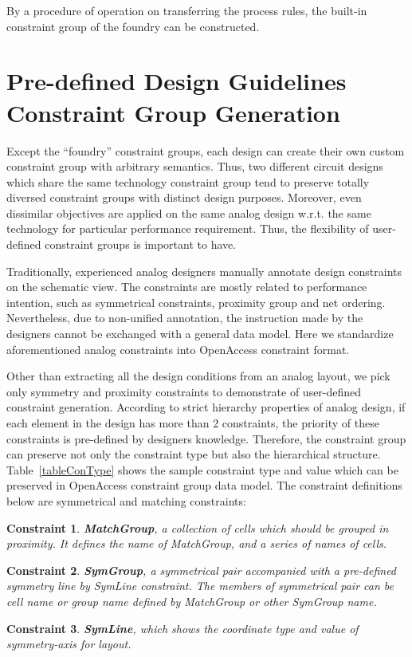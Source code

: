   By a procedure of operation on transferring the process rules, the built-in constraint group of the foundry can be constructed.

  \section{Pre-defined Design Guidelines Constraint Group Generation}\label{sec:PreDesignCG}
    Except the ``foundry'' constraint groups, each design can create their own custom constraint group with arbitrary semantics. Thus, two different circuit designs which share the same technology constraint group tend to preserve totally diversed constraint groups with distinct design purposes. Moreover, even dissimilar objectives are applied on the same analog design w.r.t. the same technology for particular performance requirement. Thus, the flexibility of user-defined constraint groups is important to have. 

    Traditionally, experienced analog designers manually annotate design constraints on the schematic view. The constraints are mostly related to performance intention, such as symmetrical constraints, proximity group and net ordering. Nevertheless, due to non-unified annotation, the instruction made by the designers cannot be exchanged with a general data model. Here we standardize aforementioned analog constraints into OpenAccess constraint format. 
  
    Other than extracting all the design conditions from an analog layout, we pick only symmetry and proximity constraints to demonstrate of user-defined constraint generation. According to strict hierarchy properties of analog design, if each element in the design has more than 2 constraints, the priority of these constraints is pre-defined by designers knowledge. Therefore, the constraint group can preserve not only the constraint type but also the hierarchical structure. Table~\ref{tableConType} shows the sample constraint type and value which can be preserved in OpenAccess constraint group data model. The constraint definitions below are symmetrical and matching constraints: 


    \newtheorem{Cons}{Constraint}
    \begin{Cons}
      {\bf MatchGroup}, a collection of cells which should be grouped in proximity. It defines the name of MatchGroup, and a series of names of cells.
    \end{Cons}
    \begin{Cons}
      {\bf SymGroup}, a symmetrical pair accompanied with a pre-defined symmetry line by SymLine constraint. The members of symmetrical pair can be cell name or group name defined by MatchGroup or other SymGroup name.
    \end{Cons}
    \begin{Cons}
      {\bf SymLine}, which shows the coordinate type and value of symmetry-axis for layout.
    \end{Cons}
  
